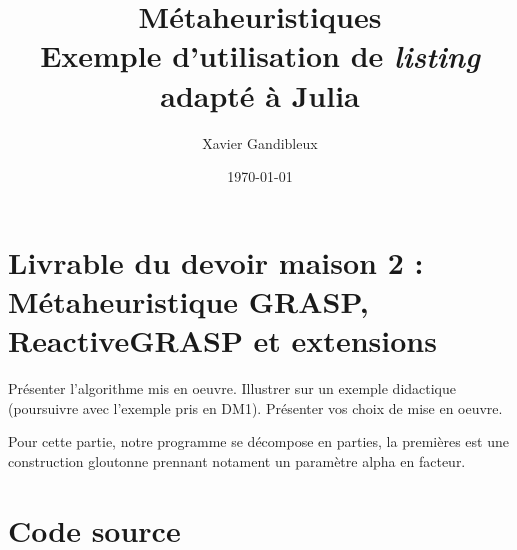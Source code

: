 \documentclass[10pt]{article}
\title{\textbf{Métaheuristiques}\\Exemple d'utilisation de \textit{listing} adapté à Julia}
\author{Xavier Gandibleux }
\date{\today}
\begin{document}
\section*{Livrable du devoir maison 2 : \\ Métaheuristique GRASP, ReactiveGRASP et extensions}

%
%

\vspace{5mm}
\noindent
{}
\vspace{2mm}

\noindent
Présenter l'algorithme mis en oeuvre. Illustrer sur un exemple didactique (poursuivre avec l'exemple pris en DM1). Présenter vos choix de mise en oeuvre.

Pour cette partie, notre programme se décompose en 
parties, la premières est une construction gloutonne prennant notament un paramètre alpha en facteur.

%
%
\section{Code source}

\end{document}
